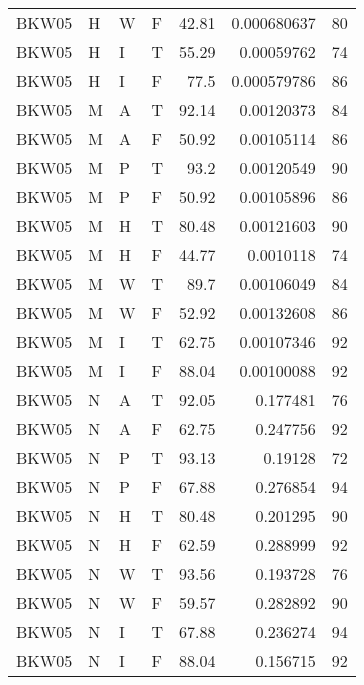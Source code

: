 \begin{table}[htb!]
{\begin{tabular}{llllrrr}
            BKW05    & H     & W     & F          & 42.81      & 0.000680637 & 80       \\
            BKW05    & H     & I     & T          & 55.29      & 0.00059762  & 74       \\
            BKW05    & H     & I     & F          & 77.5       & 0.000579786 & 86       \\
            BKW05    & M     & A     & T          & 92.14      & 0.00120373  & 84       \\
            BKW05    & M     & A     & F          & 50.92      & 0.00105114  & 86       \\
            BKW05    & M     & P     & T          & 93.2       & 0.00120549  & 90       \\
            BKW05    & M     & P     & F          & 50.92      & 0.00105896  & 86       \\
            BKW05    & M     & H     & T          & 80.48      & 0.00121603  & 90       \\
            BKW05    & M     & H     & F          & 44.77      & 0.0010118   & 74       \\
            BKW05    & M     & W     & T          & 89.7       & 0.00106049  & 84       \\
            BKW05    & M     & W     & F          & 52.92      & 0.00132608  & 86       \\
            BKW05    & M     & I     & T          & 62.75      & 0.00107346  & 92       \\
            BKW05    & M     & I     & F          & 88.04      & 0.00100088  & 92       \\
            BKW05    & N     & A     & T          & 92.05      & 0.177481    & 76       \\
            BKW05    & N     & A     & F          & 62.75      & 0.247756    & 92       \\
            BKW05    & N     & P     & T          & 93.13      & 0.19128     & 72       \\
            BKW05    & N     & P     & F          & 67.88      & 0.276854    & 94       \\
            BKW05    & N     & H     & T          & 80.48      & 0.201295    & 90       \\
            BKW05    & N     & H     & F          & 62.59      & 0.288999    & 92       \\
            BKW05    & N     & W     & T          & 93.56      & 0.193728    & 76       \\
            BKW05    & N     & W     & F          & 59.57      & 0.282892    & 90       \\
            BKW05    & N     & I     & T          & 67.88      & 0.236274    & 94       \\
            BKW05    & N     & I     & F          & 88.04      & 0.156715    & 92       \\
            \hline
        \end{tabular}
    }{
    }
\end{table} 
